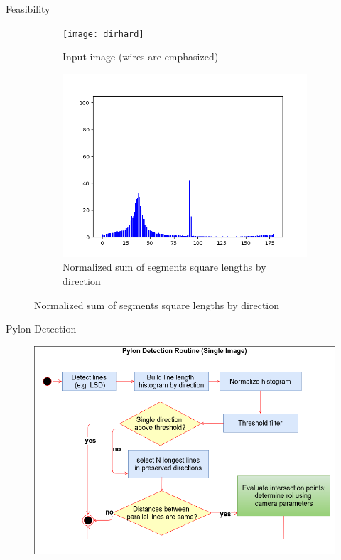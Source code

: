 \documentclass{beamer}
\begin{document}
\begin{frame}[t, fragile]{Feasibility}

\begin{figure}[H!]
\centering
\begin{subfigure}{.5\textwidth}
\centering
\texttt{[image: dirhard]}
\caption{Input image (wires are emphasized)}
\end{subfigure}%
\begin{subfigure}{.5\textwidth}
 \centering
\includegraphics[width=1\linewidth]{dirhisthard}
\caption{Normalized sum of segments square lengths by direction}
\end{subfigure}
\end{figure}
\end{frame}



\begin{frame}[t, fragile]{Pylon Detection}
\begin{figure}
\centering
\includegraphics[scale=0.33]{DetectionSimple}
\end{figure}
\end{frame}
\end{document}
